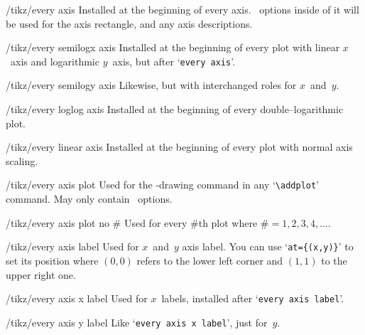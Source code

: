 \begin{stylekey}{/tikz/every axis}
 Installed at the beginning of every axis. \Tikz\ options inside of it will be used for the axis rectangle, and any axis descriptions.
\end{stylekey}

\begin{stylekey}{/tikz/every semilogx axis}
 Installed at the beginning of every plot with linear $x$~axis and logarithmic $y$~axis, but after `\texttt{every axis}'.
\end{stylekey}

\begin{stylekey}{/tikz/every semilogy axis}
 Likewise, but with interchanged roles for $x$~and~$y$.
\end{stylekey}

\begin{stylekey}{/tikz/every loglog axis}
 Installed at the beginning of every double--logarithmic plot.
\end{stylekey}

\begin{stylekey}{/tikz/every linear axis}
 Installed at the beginning of every plot with normal axis scaling.
\end{stylekey}

\begin{stylekey}{/tikz/every axis plot}
 Used for the \Tikz-drawing command in any `\lstinline!\addplot!' command. May only contain \Tikz\ options.
\end{stylekey}

\begin{stylekey}{/tikz/every axis plot no \#}
 Used for every \#th plot where $\#=1,2,3,4,\dotsc$.
\end{stylekey}

\begin{stylekey}{/tikz/every axis label}
 Used for $x$~and~$y$ axis label. You can use `\texttt{at=\{(x,y)\}}' to set its position where $(0,0)$ refers to the lower left corner and $(1,1)$ to the upper right one.
\end{stylekey}

\begin{stylekey}{/tikz/every axis x label}
 Used for $x$~labels, installed after `\texttt{every axis label}'.
\end{stylekey}

\begin{stylekey}{/tikz/every axis y label}
 Like `\texttt{every axis x label}', just for~$y$.
\end{stylekey}

